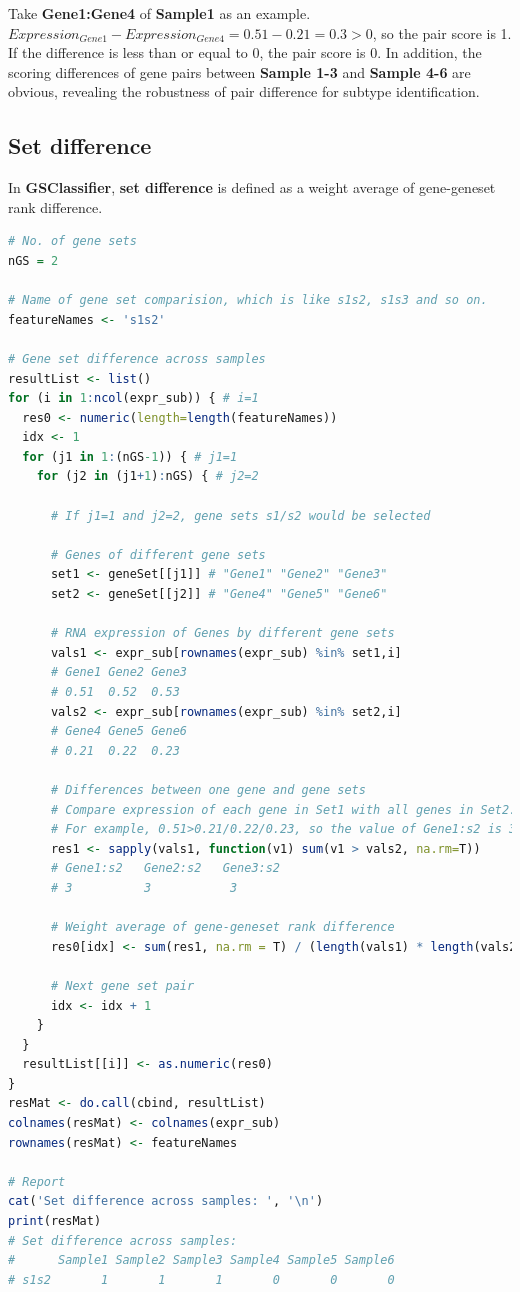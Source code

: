 \documentclass[
  12pt,
]{book}
\begin{document}
Take \textbf{Gene1:Gene4} of \textbf{Sample1} as an example. \(Expression_{Gene1} - Expression_{Gene4} = 0.51-0.21 = 0.3 > 0\), so the pair score is 1. If the difference is less than or equal to 0, the pair score is 0. In addition, the scoring differences of gene pairs between \textbf{Sample 1-3} and \textbf{Sample 4-6} are obvious, revealing the robustness of pair difference for subtype identification.

\hypertarget{set-difference}{%
\subsection{Set difference}\label{set-difference}}

In \textbf{GSClassifier}, \textbf{set difference} is defined as a weight average of gene-geneset rank difference.

\begin{lstlisting}[language=R]
# No. of gene sets
nGS = 2

# Name of gene set comparision, which is like s1s2, s1s3 and so on.
featureNames <- 's1s2'

# Gene set difference across samples
resultList <- list()
for (i in 1:ncol(expr_sub)) { # i=1
  res0 <- numeric(length=length(featureNames))
  idx <- 1
  for (j1 in 1:(nGS-1)) { # j1=1
    for (j2 in (j1+1):nGS) { # j2=2
      
      # If j1=1 and j2=2, gene sets s1/s2 would be selected
      
      # Genes of different gene sets
      set1 <- geneSet[[j1]] # "Gene1" "Gene2" "Gene3"
      set2 <- geneSet[[j2]] # "Gene4" "Gene5" "Gene6"
      
      # RNA expression of Genes by different gene sets
      vals1 <- expr_sub[rownames(expr_sub) %in% set1,i]
      # Gene1 Gene2 Gene3
      # 0.51  0.52  0.53
      vals2 <- expr_sub[rownames(expr_sub) %in% set2,i]
      # Gene4 Gene5 Gene6
      # 0.21  0.22  0.23

      # Differences between one gene and gene sets
      # Compare expression of each gene in Set1 with all genes in Set2. 
      # For example, 0.51>0.21/0.22/0.23, so the value of Gene1:s2 is 3.
      res1 <- sapply(vals1, function(v1) sum(v1 > vals2, na.rm=T))
      # Gene1:s2   Gene2:s2   Gene3:s2
      # 3          3           3
      
      # Weight average of gene-geneset rank difference
      res0[idx] <- sum(res1, na.rm = T) / (length(vals1) * length(vals2))
      
      # Next gene set pair
      idx <- idx + 1
    }
  }
  resultList[[i]] <- as.numeric(res0)
}
resMat <- do.call(cbind, resultList)
colnames(resMat) <- colnames(expr_sub)
rownames(resMat) <- featureNames

# Report 
cat('Set difference across samples: ', '\n')
print(resMat)
# Set difference across samples:  
#      Sample1 Sample2 Sample3 Sample4 Sample5 Sample6
# s1s2       1       1       1       0       0       0
\end{lstlisting}
\end{document}
